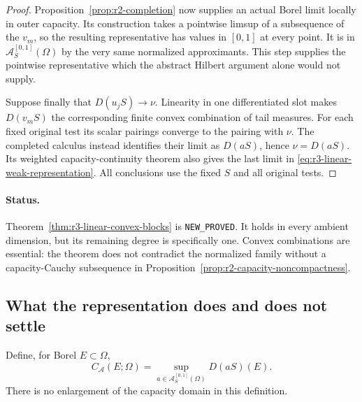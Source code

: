 \documentclass[11pt,a4paper]{article}
\numberwithin{equation}{section}
\theoremstyle{definition}
\theoremstyle{remark}
\begin{document}
\begin{proof}
Proposition~\ref{prop:r2-completion} now supplies an actual Borel
limit locally in outer capacity. Its construction takes a
pointwise limsup of a subsequence of the $v_m$, so the resulting
representative has values in $[0,1]$ at every point. It is in
$\mathcal A_S^{[0,1]}(\Omega)$ by the very same normalized
approximants. This step supplies the pointwise representative
which the abstract Hilbert argument alone would not supply.

Suppose finally that $D(u_jS)\to\nu$. Linearity in one
differentiated slot makes $D(v_mS)$ the corresponding finite
convex combination of tail measures. For each fixed original
test its scalar pairings converge to the pairing with $\nu$.
The completed calculus instead identifies their limit as
$D(aS)$, hence $\nu=D(aS)$. Its weighted capacity-continuity
theorem also gives the last limit in
\eqref{eq:r3-linear-weak-representation}. All conclusions use
the fixed $S$ and all original tests.
\end{proof}

\paragraph{Status.}
Theorem~\ref{thm:r3-linear-convex-blocks} is
\texttt{NEW\_PROVED}. It holds in every ambient dimension, but
its remaining degree is specifically one. Convex combinations
are essential: the theorem does not contradict the normalized
family without a capacity-Cauchy subsequence in
Proposition~\ref{prop:r2-capacity-noncompactness}.

\subsection{What the representation does and does not settle}

Define, for Borel $E\subset\Omega$,
\[
 C_{\mathcal A}(E;\Omega)
   =\sup_{a\in\mathcal A_S^{[0,1]}(\Omega)}D(aS)(E).
\]
There is no enlargement of the capacity domain in this definition.
\end{document}
